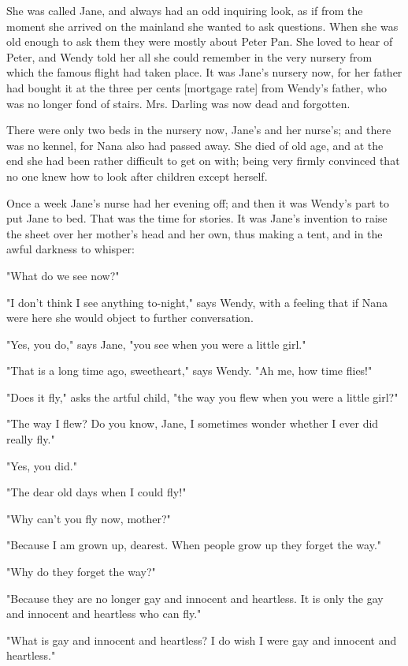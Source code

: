 She was called Jane, and always had an odd inquiring look, as if from the
moment she arrived on the mainland she wanted to ask questions. When she
was old enough to ask them they were mostly about Peter Pan. She loved to
hear of Peter, and Wendy told her all she could remember in the very
nursery from which the famous flight had taken place. It was Jane's
nursery now, for her father had bought it at the three per cents [mortgage
rate] from Wendy's father, who was no longer fond of stairs. Mrs. Darling
was now dead and forgotten.


There were only two beds in the nursery now, Jane's and her nurse's; and
there was no kennel, for Nana also had passed away. She died of old age,
and at the end she had been rather difficult to get on with; being very
firmly convinced that no one knew how to look after children except
herself.


Once a week Jane's nurse had her evening off; and then it was Wendy's part
to put Jane to bed. That was the time for stories. It was Jane's invention
to raise the sheet over her mother's head and her own, thus making a tent,
and in the awful darkness to whisper:


"What do we see now?"


"I don't think I see anything to-night," says Wendy, with a feeling that
if Nana were here she would object to further conversation.


"Yes, you do," says Jane, "you see when you were a little girl."


"That is a long time ago, sweetheart," says Wendy. "Ah me, how time
flies!"


"Does it fly," asks the artful child, "the way you flew when you were a
little girl?"


"The way I flew? Do you know, Jane, I sometimes wonder whether I ever did
really fly."


"Yes, you did."


"The dear old days when I could fly!"


"Why can't you fly now, mother?"


"Because I am grown up, dearest. When people grow up they forget the way."


"Why do they forget the way?"


"Because they are no longer gay and innocent and heartless. It is only the
gay and innocent and heartless who can fly."


"What is gay and innocent and heartless? I do wish I were gay and innocent
and heartless."



